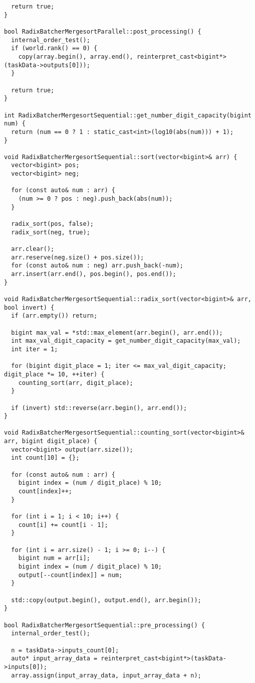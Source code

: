 ﻿\documentclass[a4paper,12pt]{article}
\begin{document}
\begin{lstlisting}
  return true;
}

bool RadixBatcherMergesortParallel::post_processing() {
  internal_order_test();
  if (world.rank() == 0) {
    copy(array.begin(), array.end(), reinterpret_cast<bigint*>(taskData->outputs[0]));
  }

  return true;
}

int RadixBatcherMergesortSequential::get_number_digit_capacity(bigint num) {
  return (num == 0 ? 1 : static_cast<int>(log10(abs(num))) + 1);
}

void RadixBatcherMergesortSequential::sort(vector<bigint>& arr) {
  vector<bigint> pos;
  vector<bigint> neg;

  for (const auto& num : arr) {
    (num >= 0 ? pos : neg).push_back(abs(num));
  }

  radix_sort(pos, false);
  radix_sort(neg, true);

  arr.clear();
  arr.reserve(neg.size() + pos.size());
  for (const auto& num : neg) arr.push_back(-num);
  arr.insert(arr.end(), pos.begin(), pos.end());
}

void RadixBatcherMergesortSequential::radix_sort(vector<bigint>& arr, bool invert) {
  if (arr.empty()) return;

  bigint max_val = *std::max_element(arr.begin(), arr.end());
  int max_val_digit_capacity = get_number_digit_capacity(max_val);
  int iter = 1;

  for (bigint digit_place = 1; iter <= max_val_digit_capacity; digit_place *= 10, ++iter) {
    counting_sort(arr, digit_place);
  }

  if (invert) std::reverse(arr.begin(), arr.end());
}

void RadixBatcherMergesortSequential::counting_sort(vector<bigint>& arr, bigint digit_place) {
  vector<bigint> output(arr.size());
  int count[10] = {};

  for (const auto& num : arr) {
    bigint index = (num / digit_place) % 10;
    count[index]++;
  }

  for (int i = 1; i < 10; i++) {
    count[i] += count[i - 1];
  }

  for (int i = arr.size() - 1; i >= 0; i--) {
    bigint num = arr[i];
    bigint index = (num / digit_place) % 10;
    output[--count[index]] = num;
  }

  std::copy(output.begin(), output.end(), arr.begin());
}

bool RadixBatcherMergesortSequential::pre_processing() {
  internal_order_test();

  n = taskData->inputs_count[0];
  auto* input_array_data = reinterpret_cast<bigint*>(taskData->inputs[0]);
  array.assign(input_array_data, input_array_data + n);


\end{lstlisting}
\end{document}
